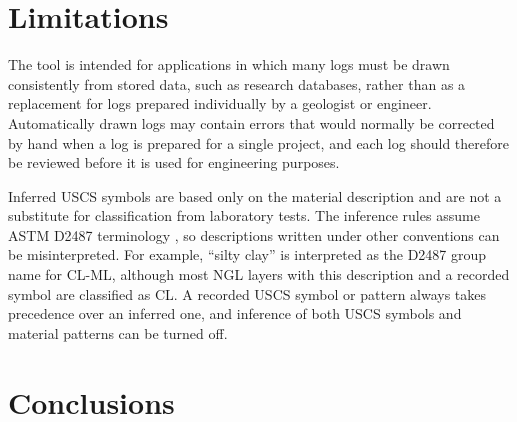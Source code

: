 \documentclass[Journal,letterpaper,InsideFigs]{ascelike-new}
\begin{document}
\section{Limitations}

The tool is intended for applications in which many logs must be drawn consistently from stored data, such as research databases, rather than as a replacement for logs prepared individually by a geologist or engineer. Automatically drawn logs may contain errors that would normally be corrected by hand when a log is prepared for a single project, and each log should therefore be reviewed before it is used for engineering purposes.

Inferred USCS symbols are based only on the material description and are not a substitute for classification from laboratory tests. The inference rules assume ASTM D2487 terminology \cite{ASTM2017a}, so descriptions written under other conventions can be misinterpreted. For example, ``silty clay'' is interpreted as the D2487 group name for CL-ML, although most NGL layers with this description and a recorded symbol are classified as CL. A recorded USCS symbol or pattern always takes precedence over an inferred one, and inference of both USCS symbols and material patterns can be turned off.


\section{Conclusions}
\end{document}
